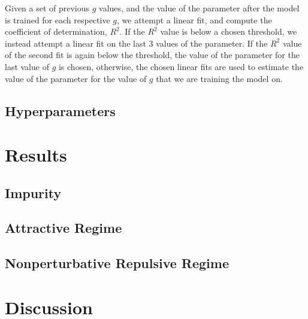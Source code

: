 \documentclass
[amsmath,10pt,aps,preprintnumbers,onecolumn,groupedaddress,superscriptaddress,notitlepage,nofootinbib,prd]{revtex4-1}
\begin{document}
Given a set of previous $g$ values, and the value of the parameter after the model is trained for each respective $g$, we attempt a linear fit, and compute the coefficient of determination, $R^2$. If the $R^2$ value is below a chosen threshold, we instead attempt a linear fit on the last $3$ values of the parameter. If the $R^2$ value of the second fit is again below the threshold, the value of the parameter for the last value of $g$ is chosen, otherwise, the chosen linear fits are used to estimate the value of the parameter for the value of $g$ that we are training the model on.


\subsection{Hyperparameters}

\section{Results}
\subsection{Impurity}
\subsection{Attractive Regime}
\subsection{Nonperturbative Repulsive Regime}
\section{Discussion}
\end{document}
